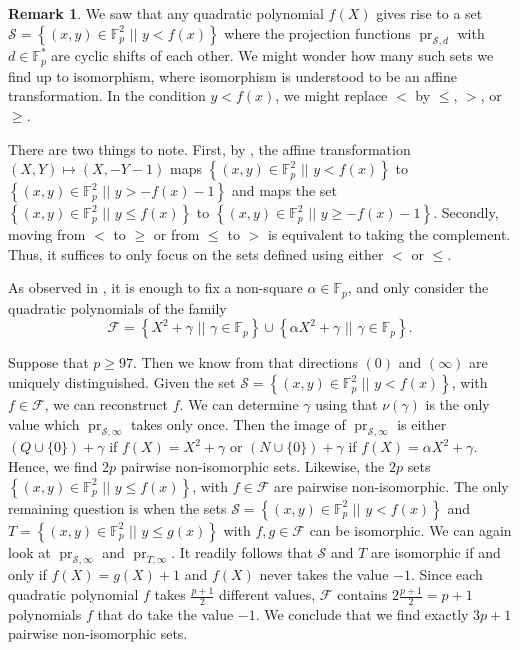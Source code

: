 \documentclass[a4paper, 12pt]{article}
\theoremstyle{definition}
\newtheorem{rmk}[thm]{Remark}
\newcommand{\FF}{\mathbb F}
\newcommand{\sett}[2]{ \left\{ #1 \, \, || \, \, #2 \right \} }
\newcommand{\mf}{\mathcal F}
\newcommand{\ms}{\mathcal S}
\DeclareMathOperator{\pr}{pr}
\begin{document}
\begin{rmk}
 We saw that any quadratic polynomial $f(X)$ gives rise to a set $\ms = \sett{(x,y) \in \FF_p^2}{y < f(x)}$ where the projection functions $\pr_{\ms,d}$ with $d \in \FF_p^*$ are cyclic shifts of each other.
 We might wonder how many such sets we find up to isomorphism, where isomorphism is understood to be an affine transformation.
 In the condition $y < f(x)$, we might replace $<$ by $\leq$, $>$, or $\geq$.
 
 There are two things to note.
 First, by , the affine transformation $(X,Y) \mapsto (X,-Y-1)$ maps $\sett{(x,y) \in \FF_p^2}{y < f(x)}$ to $\sett{(x,y) \in \FF_p^2}{y > -f(x)-1}$ and maps the set $\sett{(x,y) \in \FF_p^2}{y \leq f(x)}$ to $\sett{(x,y) \in \FF_p^2}{y \geq -f(x)-1}$.
 Secondly, moving from $<$ to $\geq$ or from $\leq$ to $>$ is equivalent to taking the complement.
 Thus, it suffices to only focus on the sets defined using either $<$ or $\leq$.
 
 As observed in , it is enough to fix a non-square $\alpha \in \FF_p$, and only consider the quadratic polynomials of the family
 \[
  \mf = \sett{X^2 + \gamma}{ \gamma \in \FF_p } \cup \sett{\alpha X^2 + \gamma}{ \gamma \in \FF_p }.
 \]
 
 Suppose that $p \geq 97$.
 Then we know from  that directions $(0)$ and $(\infty)$ are uniquely distinguished.
 Given the set $\ms = \sett{(x,y) \in \FF_p^2}{y < f(x)}$, with $f \in \mf$, we can reconstruct $f$.
 We can determine $\gamma$ using that $\nu(\gamma)$ is the only value which $\pr_{\ms,\infty}$ takes only once.
 Then the image of $\pr_{\ms,\infty}$ is either $(Q \cup \{0\}) + \gamma$ if $f(X) = X^2 + \gamma$ or $(N \cup \{0\}) + \gamma$ if $f(X) = \alpha X^2 + \gamma$.
 Hence, we find $2p$ pairwise non-isomorphic sets.
 Likewise, the $2p$ sets $\sett{(x,y) \in \FF_p^2}{y \leq f(x)}$, with $f \in \mf$ are pairwise non-isomorphic.
 The only remaining question is when the sets
 $\ms = \sett{(x,y) \in \FF_p^2}{y < f(x)}$ and $T = \sett{(x,y) \in \FF_p^2}{y \leq g(x)}$ with $f, g \in \mf$ can be isomorphic.
 We can again look at $\pr_{\ms,\infty}$ and $\pr_{T,\infty}$.
 It readily follows that $\ms$ and $T$ are isomorphic if and only if $f(X) = g(X)+1$ and $f(X)$ never takes the value $-1$.
 Since each quadratic polynomial $f$ takes $\frac{p+1}2$ different values, $\mf$ contains $2 \frac{p+1}2 = p+1$ polynomials $f$ that do take the value $-1$.
 We conclude that we find exactly $3p+1$ pairwise non-isomorphic sets.
\end{rmk}
\end{document}
